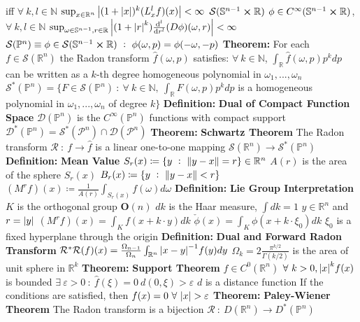 \documentclass[14pt]{extarticle}
\def\Definition{{\color{blue} \textbf{Definition:} }}
\def\Theorem{{\color{red} \textbf{Theorem:} }}
\begin{document}
\begin{outline}
						iff $\forall~k,l \in \mathbb{N}$
				\3	$\sup_{x \in \mathbb{R}^n}\abs{(1 + \abs{x})^k(L_x^lf)(x)} < \infty$
			\2	$\mathcal{S}(\mathbb{S}^{n-1} \cross \mathbb{R})$ 
				\3	$\phi \in C^{\infty}(\mathbb{S}^{n-1} \cross \mathbb{R})$, $\forall~k,l \in \mathbb{N}$
				\3	$\sup_{\omega \in \mathbb{S}^{n-1},r \in \mathbb{R}} 
						\abs{(1 + \abs{r}^k) \od[l]{}{r}(D\phi)(\omega,r)} < \infty$
			\2	$\mathcal{S}(\mathbb{P}^n) \equiv \phi \in \mathcal{S}(\mathbb{S}^{n-1} \cross \mathbb{R})
					~:~\phi(\omega,p) = \phi(-\omega,-p)$
		\1	\Theorem For each $f \in \mathcal{S}(\mathbb{R}^n)$ the Radon transform
				$\hat{f}(\omega,p)$ satisfies: $\forall~k \in \mathbb{N}$, 
				$\int_{\mathbb{R}}\hat{f}(\omega,p)p^kdp$ can be written as a $k$-th
				degree homogeneous polynomial in $\omega_1,...,\omega_n$
				\2	$\mathcal{S}^*(\mathbb{P}^n) = \{F \in \mathcal{S}(\mathbb{P}^n)~:~
				\forall~k \in \mathbb{N},~\int_{\mathbb{R}}F(\omega,p)p^k dp$ is a
				homogeneous polynomial in $\omega_1,...,\omega_n$ of degree $k\}$
		\1	\Definition \textbf{Dual of Compact Function Space}
			\2	$\mathcal{D}(\mathbb{P}^n)$ is the $C^{\infty}(\mathbb{P}^n)$ functions with compact support
			\2	$\mathcal{D}^*(\mathbb{P}^n) = \mathcal{S}^*(\mathcal{P}^n) \cap \mathcal{D}(\mathcal{P}^n)$ 
		\1	\Theorem \textbf{Schwartz Theorem}
			\2	The Radon transform $\mathcal{R}~:~f \rightarrow \hat{f}$ is a linear
					one-to-one mapping $\mathcal{S}(\mathbb{R}^n) \rightarrow \mathcal{S}^*(\mathbb{P}^n)$
		\1	\Definition \textbf{Mean Value}
			\2	$S_r(x) \coloneqq \{y~:~\norm{y - x} = r\} \in \mathbb{R}^n$
			\2	$A(r)$ is the area of the sphere $S_r(x)$
			\2	$B_r(x) \coloneqq \{y~:~\norm{y - x} < r\}$
			\2	$(M^rf)(x) \coloneqq \frac{1}{A(r)}\int_{S_r(x)}f(\omega)d\omega$
			\2	\Definition \textbf{Lie Group Interpretation}
				\3	$K$ is the orthogonal group $\bm{O}(n)$
				\3	$dk$ is the Haar measure, $\int dk = 1$
				\3	$y \in \mathbb{R}^n$ and $r = \abs{y}$
				\3	$(M^rf)(x) = \int_K f(x + k \cdot y)dk$
				\3	$\check{\phi}(x) = \int_K \phi(x + k \cdot \xi_0)dk$
					\4	$\xi_0$ is a fixed hyperplane through the origin
		\1	\Definition \textbf{Dual and Forward Radon Transform}
			\2	$\mathcal{R}^*\mathcal{R}(f)(x) = 
				\frac{\Omega_{n-1}}{\Omega_n}\int_{\mathbb{R}^n}\abs{x - y}^{-1}f(y)dy$
				\3	$\Omega_k = 2 \frac{\pi^{k/2}}{\Gamma(k/2)}$ is the area of unit
						sphere in $\mathbb{R}^k$
		\1	\Theorem \textbf{Support Theorem}
			\2	$f \in C^0(\mathbb{R}^n)$
			\2	$\forall~k > 0, \abs{x}^kf(x)$ is bounded
			\2	$\exists~\varepsilon > 0~:~\hat{f}(\xi) = 0~d(0,\xi) > \varepsilon$
				\3	$d$ is a distance function
			\2	If the conditions are satisfied, then $f(x) = 0~\forall~\abs{x} > \varepsilon$
		\1	\Theorem \textbf{Paley-Wiener Theorem}
			\2	The Radon transform is a bijection $\mathcal{R}~:~D(\mathbb{R}^n) \rightarrow D^*(\mathbb{P}^n)$
	

\end{outline}
\end{document}
